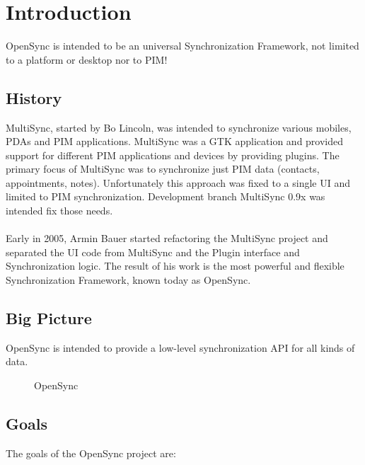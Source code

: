 \chapter{Introduction}
\label{chap:intro}
OpenSync is intended to be an universal Synchronization Framework, not limited to
a platform or desktop nor to PIM!

\section{History}
MultiSync, started by Bo Lincoln, was intended to synchronize various mobiles,
PDAs and PIM applications. MultiSync was a GTK application and provided
support for different PIM applications and devices by providing plugins.
The primary focus of MultiSync was to synchronize just PIM data (contacts, 
appointments, notes). Unfortunately this approach was fixed to a single UI and 
limited to PIM synchronization. Development branch MultiSync 0.9x was 
intended fix those needs.\\
\\
Early in 2005, Armin Bauer started refactoring the MultiSync project and
separated the UI code from MultiSync and the Plugin interface and
Synchronization logic. The result of his work is the most powerful and
flexible Synchronization Framework, known today as OpenSync.
\section{Big Picture}
OpenSync is intended to provide a low-level synchronization API for all kinds of 
data.
\\
\begin{figure}
 \centering
 \caption{OpenSync}
 \label{fig:bigpicture}
\end{figure}


\section{Goals}
The goals of the OpenSync project are:

